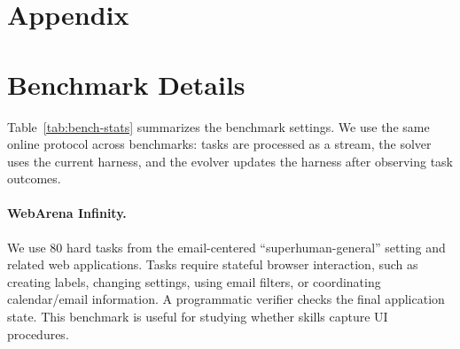\section*{Appendix}


\section{Benchmark Details}\label{app:benchmarks}

Table~\ref{tab:bench-stats} summarizes the benchmark settings. We use the same
online protocol across benchmarks: tasks are processed as a stream, the solver
uses the current harness, and the evolver updates the harness after observing
task outcomes.

\begin{table}[h]
\centering
\caption{Benchmark statistics and evaluation signals.}
\label{tab:bench-stats}
\small
\setlength{\tabcolsep}{3pt}
\end{table}

\paragraph{WebArena Infinity.}
We use 80 hard tasks from the email-centered ``superhuman-general'' setting and
related web applications. Tasks require stateful browser interaction, such as
creating labels, changing settings, using email filters, or coordinating
calendar/email information. A programmatic verifier checks the final application
state. This benchmark is useful for studying whether skills capture UI
procedures.

